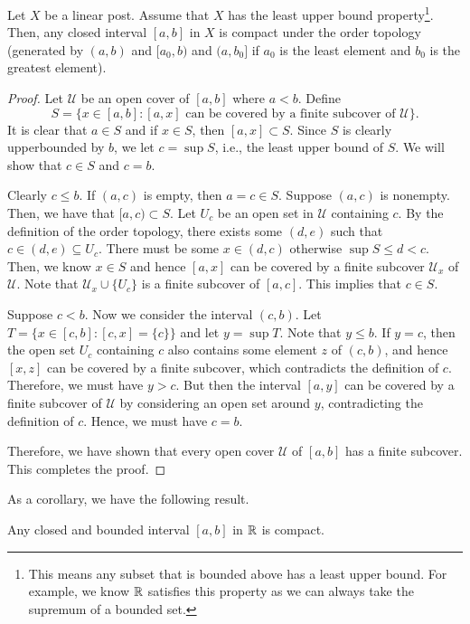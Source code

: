 \begin{theorem}
    Let $X$ be a linear post. Assume that $X$ has the least upper bound property\footnote{This means any subset that is bounded above has a least upper bound. For example, we know $\mathbb{R}$ satisfies this property as we can always take the supremum of a bounded set.}. Then, any closed interval $[a,b]$ in $X$ is compact under the order topology (generated by $(a,b)$ and $[a_0,b)$ and $(a,b_0]$ if $a_0$ is the least element and $b_0$ is the greatest element).
\end{theorem}
\begin{proof}
    Let $\mathcal{U}$ be an open cover of $[a,b]$ where $a<b$. Define 
    \[
        S=\{x\in [a,b]:[a,x]\text{ can be covered by a finite subcover of }\mathcal{U}\}.
    \]
    It is clear that $a\in S$ and if $x\in S$, then $[a,x]\subset S$. Since $S$ is clearly upperbounded by $b$, we let $c=\sup S$, i.e., the least upper bound of $S$. We will show that $c\in S$ and $c=b$. 
    
    Clearly $c\leq b$. If $(a,c)$ is empty, then $a=c\in S$. Suppose $(a,c)$ is nonempty. Then, we have that $[a,c)\subset S$. Let $U_c$ be an open set in $\mathcal{U}$ containing $c$. By the definition of the order topology, there exists some $(d,e)$ such that $c\in (d,e)\subseteq U_c$. There must be some $x\in (d,c)$ otherwise $\sup S\leq d<c$. Then, we know $x\in S$ and hence $[a,x]$ can be covered by a finite subcover $\mathcal{U}_x$ of $\mathcal{U}$. Note that $\mathcal{U}_x\cup \{U_c\}$ is a finite subcover of $[a,c]$. This implies that $c\in S$.
    


    Suppose $c<b$. Now we consider the interval $(c,b)$. Let $T=\{x\in [c,b]:[c,x]=\{c\}\}$ and let $y=\sup T$. Note that $y\leq b$. If $y=c$, then the open set $U_c$ containing $c$ also contains some element $z$ of $(c,b)$, and hence $[x,z]$ can be covered by a finite subcover, which contradicts the definition of $c$. Therefore, we must have $y>c$. But then the interval $[a,y]$ can be covered by a finite subcover of $\mathcal{U}$ by considering an open set around $y$, contradicting the definition of $c$. Hence, we must have $c=b$.

    Therefore, we have shown that every open cover $\mathcal{U}$ of $[a,b]$ has a finite subcover. This completes the proof.

\end{proof}

As a corollary, we have the following result.
\begin{corollary}
    Any closed and bounded interval $[a,b]$ in $\mathbb{R}$ is compact. 
\end{corollary}

